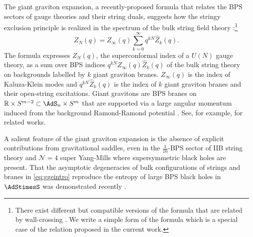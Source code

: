\documentclass[a4paper,12pt]{article}
\begin{document}
The giant graviton expansion, a recently-proposed formula that relates the BPS sectors of gauge theories and their string duals, suggests how the stringy exclusion principle is realized in the spectrum of the bulk string field theory \cite{Gaiotto:2021xce,Arai:2019xmp,Imamura:2021ytr}:\footnote{There exist different but compatible versions of the formula that are related by wall-crossing \cite{Gaiotto:2021xce,Lee:2022vig}. We write a simple form of the formula which is a special case of the relation proposed in the current work.}
\begin{equation} \label{eq:ggeintro}
Z_N(q) = Z_\infty(q) \sum_{k=0}^\infty q^{k N} \hat{Z}_{k} (q).
\end{equation}
The formula expresses $Z_N(q)$, the superconformal index \cite{Kinney:2005ej} of a $U(N)$ gauge theory, as a sum over BPS indices $q^{k N} Z_\infty(q) \hat{Z}_{k} (q)$ of the bulk string theory on backgrounds labelled by $k$ giant graviton branes. $Z_\infty(q)$ is the index of Kaluza-Klein modes and $q^{k N} \hat{Z}_{k} (q)$ is the index of $k$ giant graviton branes and their open-string excitations. Giant gravitons are BPS branes on $\mathbb{R} \times S^{m-2} \subset \AdS_n \times S^m$ that are supported via a large angular momentum induced from the background Ramond-Ramond potential \cite{McGreevy:2000cw,Grisaru:2000zn,Hashimoto:2000zp}. See, for example, \cite{Lee:2022vig,Arai:2020qaj,Arai:2020uwd,Murthy:2022ien,Imamura:2022aua,Choi:2022ovw,Liu:2022olj,Eniceicu:2023uvd,Gautason:2023igo,Beccaria:2023zjw,Beccaria:2023hip,Beccaria:2023sph,Fujiwara:2023bdc} for related works.

A salient feature of the giant graviton expansion is the absence of explicit contributions from gravitational saddles, even in the $\frac{1}{16}$-BPS sector of IIB string theory and $\mathcal{N}=4$ super Yang-Mills where supersymmetric black holes are present. That the asymptotic degeneracies of bulk configurations of strings and branes in \eqref{eq:ggeintro} reproduce the entropy of large BPS black holes in $\AdStimesS$ was demonstrated recently \cite{Choi:2022ovw,Beccaria:2023hip}. 
\end{document}

